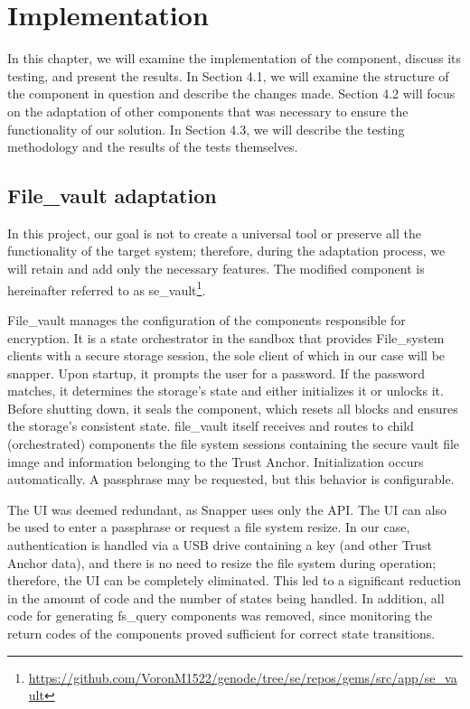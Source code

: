\chapter{Implementation}

In this chapter, we will examine the implementation of the component, discuss its testing, and present the results. In Section 4.1, we will examine the structure of the component in question and describe the changes made. Section 4.2 will focus on the adaptation of other components that was necessary to ensure the functionality of our solution. In Section 4.3, we will describe the testing methodology and the results of the tests themselves.

\section{File\_vault adaptation}

In this project, our goal is not to create a universal tool or preserve all the functionality of the target system; therefore, during the adaptation process, we will retain and add only the necessary features. The modified component is hereinafter referred to as se\_vault\footnote{\url{https://github.com/VoronM1522/genode/tree/se/repos/gems/src/app/se\_vault}}.

File\_vault manages the configuration of the components responsible for encryption. It is a state orchestrator in the sandbox that provides File\_system clients with a secure storage session, the sole client of which in our case will be snapper. Upon startup, it prompts the user for a password. If the password matches, it determines the storage’s state and either initializes it or unlocks it. Before shutting down, it seals the component, which resets all blocks and ensures the storage’s consistent state. file\_vault itself receives and routes to child (orchestrated) components the file system sessions containing the secure vault file image and information belonging to the Trust Anchor. Initialization occurs automatically. A passphrase may be requested, but this behavior is configurable.

The UI was deemed redundant, as Snapper uses only the API. The UI can also be used to enter a passphrase or request a file system resize. In our case, authentication is handled via a USB drive containing a key (and other Trust Anchor data), and there is no need to resize the file system during operation; therefore, the UI can be completely eliminated. This led to a significant reduction in the amount of code and the number of states being handled. In addition, all code for generating fs\_query components was removed, since monitoring the return codes of the components proved sufficient for correct state transitions.

